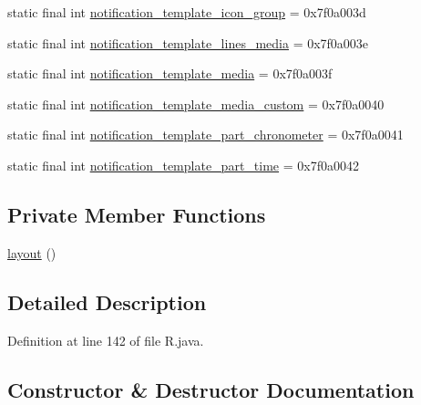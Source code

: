 \begin{DoxyCompactItemize}
\item 
static final int \mbox{\hyperlink{classcom_1_1jjoe64_1_1graphview_1_1_r_1_1layout_ae2d3fc853cf33c9b20d1ea94e4e157e4}{notification\+\_\+template\+\_\+icon\+\_\+group}} = 0x7f0a003d
\item 
static final int \mbox{\hyperlink{classcom_1_1jjoe64_1_1graphview_1_1_r_1_1layout_af17a4278b49237e76bcda04523825c8e}{notification\+\_\+template\+\_\+lines\+\_\+media}} = 0x7f0a003e
\item 
static final int \mbox{\hyperlink{classcom_1_1jjoe64_1_1graphview_1_1_r_1_1layout_a6ca88063ea0500c2a07c5f9f8ac38f60}{notification\+\_\+template\+\_\+media}} = 0x7f0a003f
\item 
static final int \mbox{\hyperlink{classcom_1_1jjoe64_1_1graphview_1_1_r_1_1layout_ac4d8f25f8f200ec395d4ab70fc6fb480}{notification\+\_\+template\+\_\+media\+\_\+custom}} = 0x7f0a0040
\item 
static final int \mbox{\hyperlink{classcom_1_1jjoe64_1_1graphview_1_1_r_1_1layout_a2a447a9160e3e780cf7d16d90b89c3a1}{notification\+\_\+template\+\_\+part\+\_\+chronometer}} = 0x7f0a0041
\item 
static final int \mbox{\hyperlink{classcom_1_1jjoe64_1_1graphview_1_1_r_1_1layout_a1c660f2e11ff1a857164365cd2858868}{notification\+\_\+template\+\_\+part\+\_\+time}} = 0x7f0a0042
\end{DoxyCompactItemize}
\subsection*{Private Member Functions}
\begin{DoxyCompactItemize}
\item 
\mbox{\hyperlink{classcom_1_1jjoe64_1_1graphview_1_1_r_1_1layout_a0ae6e06d666cc8adceb182adda9b41e5}{layout}} ()
\end{DoxyCompactItemize}


\subsection{Detailed Description}


Definition at line 142 of file R.\+java.



\subsection{Constructor \& Destructor Documentation}
\mbox{\label{classcom_1_1jjoe64_1_1graphview_1_1_r_1_1layout_a0ae6e06d666cc8adceb182adda9b41e5}} 
